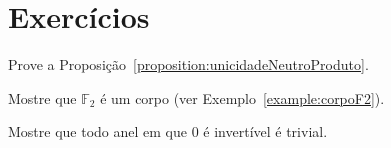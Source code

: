 \section*{Exercícios}
\begin{exercise}
    Prove a Proposição~\ref{proposition:unicidadeNeutroProduto}.
\end{exercise}
\begin{exercise}\label{exercise:corpoF2}
    Mostre que $\mathbb F_2$ é um corpo (ver Exemplo~\ref{example:corpoF2}).
\end{exercise}
\begin{exercise}
    Mostre que todo anel em que $0$ é invertível é trivial.
\end{exercise}
